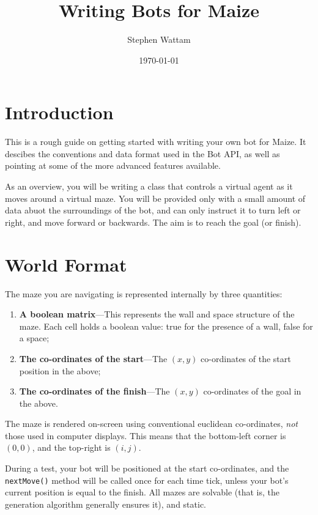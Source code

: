 \documentclass[11pt]{article}
\begin{document}
\title{Writing Bots for Maize}
\author{Stephen Wattam}
\date{\today}
\maketitle

\tableofcontents{}
\pagebreak


\section{Introduction}
This is a rough guide on getting started with writing your own bot for Maize.  It descibes the conventions and data format used in the Bot API, as well as pointing at some of the more advanced features available.

As an overview, you will be writing a class that controls a virtual agent as it moves around a virtual maze.  You will be provided only with a small amount of data abuot the surroundings of the bot, and can only instruct it to turn left or right, and move forward or backwards.  The aim is to reach the goal (or finish).


\section{World Format}
The maze you are navigating is represented internally by three quantities:
\begin{enumerate}
\item \textbf{A boolean matrix}---This represents the wall and space structure of the maze.  Each cell holds a boolean value: true for the presence of a wall, false for a space;
\item \textbf{The co-ordinates of the start}---The $(x,y)$ co-ordinates of the start position in the above;
\item \textbf{The co-ordinates of the finish}---The $(x,y)$ co-ordinates of the goal in the above.
\end{enumerate}
The maze is rendered on-screen using conventional euclidean co-ordinates, \textit{not} those used in computer displays.  This means that the bottom-left corner is $(0,0)$, and the top-right is $(i,j)$.


During a test, your bot will be positioned at the start co-ordinates, and the \texttt{nextMove()} method will be called once for each time tick, unless your bot's current position is equal to the finish.  All mazes are solvable (that is, the generation algorithm generally ensures it), and static.
\end{document}
